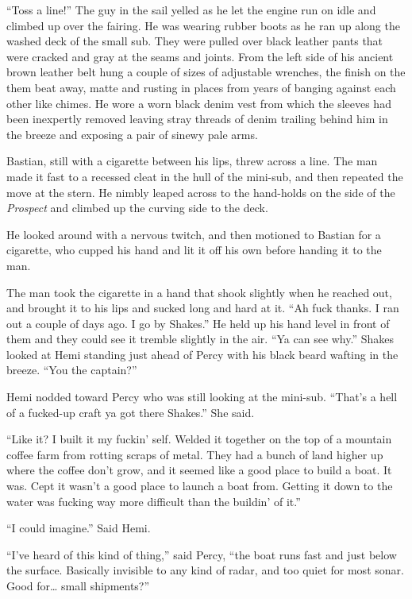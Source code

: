 \documentclass[]{scrbook}
\begin{document}
``Toss a line!'' The guy in the sail yelled as he let the engine run on
idle and climbed up over the fairing. He was wearing rubber boots as he
ran up along the washed deck of the small sub. They were pulled over
black leather pants that were cracked and gray at the seams and joints.
From the left side of his ancient brown leather belt hung a couple of
sizes of adjustable wrenches, the finish on the them beat away, matte
and rusting in places from years of banging against each other like
chimes. He wore a worn black denim vest from which the sleeves had been
inexpertly removed leaving stray threads of denim trailing behind him in
the breeze and exposing a pair of sinewy pale arms.

Bastian, still with a cigarette between his lips, threw across a line.
The man made it fast to a recessed cleat in the hull of the mini-sub,
and then repeated the move at the stern. He nimbly leaped across to the
hand-holds on the side of the \emph{Prospect} and climbed up the curving
side to the deck.

He looked around with a nervous twitch, and then motioned to Bastian for
a cigarette, who cupped his hand and lit it off his own before handing
it to the man.

The man took the cigarette in a hand that shook slightly when he reached
out, and brought it to his lips and sucked long and hard at it. ``Ah
fuck thanks. I ran out a couple of days ago. I go by Shakes.'' He held
up his hand level in front of them and they could see it tremble
slightly in the air. ``Ya can see why.'' Shakes looked at Hemi standing
just ahead of Percy with his black beard wafting in the breeze. ``You
the captain?''

Hemi nodded toward Percy who was still looking at the mini-sub. ``That's
a hell of a fucked-up craft ya got there Shakes.'' She said.

``Like it? I built it my fuckin' self. Welded it together on the top of
a mountain coffee farm from rotting scraps of metal. They had a bunch of
land higher up where the coffee don't grow, and it seemed like a good
place to build a boat. It was. Cept it wasn't a good place to launch a
boat from. Getting it down to the water was fucking way more difficult
than the buildin' of it.''

``I could imagine.'' Said Hemi.

``I've heard of this kind of thing,'' said Percy, ``the boat runs fast
and just below the surface. Basically invisible to any kind of radar,
and too quiet for most sonar. Good for\ldots{} small shipments?''
\end{document}
